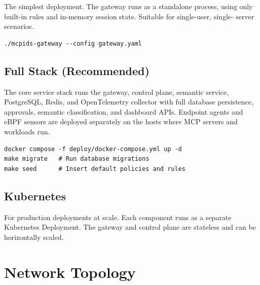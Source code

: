 \documentclass[12pt,a4paper]{report}
\begin{document}
The simplest deployment. The gateway runs as a standalone process, using only
built-in rules and in-memory session state. Suitable for single-user, single-
server scenarios.

\begin{lstlisting}[caption={Start gateway only}]
./mcpids-gateway --config gateway.yaml
\end{lstlisting}

\subsection{Full Stack (Recommended)}

The core service stack runs the gateway, control plane, semantic service,
PostgreSQL, Redis, and OpenTelemetry collector with full database persistence,
approvals, semantic classification, and dashboard APIs. Endpoint agents and
eBPF sensors are deployed separately on the hosts where MCP servers and
workloads run.

\begin{lstlisting}[caption={Start full stack with Docker Compose}]
docker compose -f deploy/docker-compose.yml up -d
make migrate   # Run database migrations
make seed      # Insert default policies and rules
\end{lstlisting}

\subsection{Kubernetes}

For production deployments at scale. Each component runs as a separate
Kubernetes Deployment. The gateway and control plane are stateless and can be
horizontally scaled.

\section{Network Topology}
\end{document}
